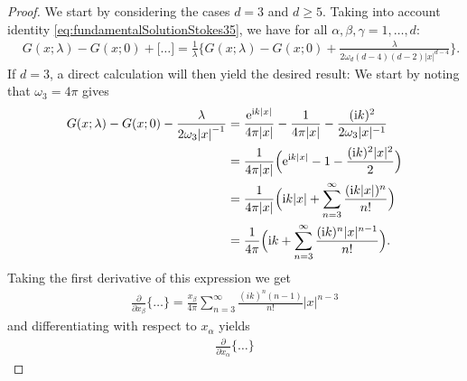 \begin{proof}
  We start by considering the cases $d = 3$ and $d \geq 5$.
      Taking into account identity \eqref{eq:fundamentalSolutionStokes35}, we have for all $\alpha, \beta, \gamma = 1,\dots,d$:
      \begin{align*}
        & G(x; \lambda) - G(x; 0) + \big[ \dots \big]
        = \frac{1}{\lambda} \bigg\{ G(x; \lambda) - G(x; 0) + \frac{\lambda}{2 \omega_d (d - 4) (d - 2) |x|^{d - 4}} \bigg\}.
      \end{align*}
  If $d = 3$, a direct calculation will then yield the desired result:
  We start by noting that $\omega_3 = 4 \pi$ gives
  \begin{align*}
    G(x; \lambda) - G(x; 0) - \frac{\lambda}{2\omega_3 {|x|}^{-1}}
    &= \frac{\mathrm{e}^{\mathrm{i} k |x|}}{4\pi |x|} - \frac{1}{4 \pi |x|} - \frac{(\mathrm{i} k)^2}{2 \omega_3 |x|^{-1}} \\
    &= \frac{1}{4 \pi |x|} \Big( \mathrm{e}^{\mathrm{i} k |x|} - 1 - \frac{ (\mathrm{i} k)^2 |x|^2}{2} \Big)\\
    &= \frac{1}{4 \pi |x|} \Big( \mathrm{i} k |x| + \sum_{n = 3}^\infty \frac{(\mathrm{i} k |x| )^n}{n!} \Big) \\
    &= \frac{1}{4\pi} \Big( \mathrm{i} k + \sum_{n = 3}^\infty \frac{ (\mathrm{i} k )^n |x|^{n - 1}}{n!} \Big).
  \end{align*}
  Taking the first derivative of this expression we get
  \begin{align*}
    \frac{\partial}{\partial x_\beta} \Big\{ \dots \Big\} = 
    \frac{x_\beta}{4 \pi} \sum_{n = 3}^\infty \frac{(ik)^n (n - 1) }{n!} |x|^{n - 3}
  \end{align*}
  and differentiating with respect to $x_\alpha$ yields
  \begin{align*}
    \frac{\partial}{\partial x_\alpha} \Big\{ \dots  \Big\}

\end{align*}
\end{proof}
